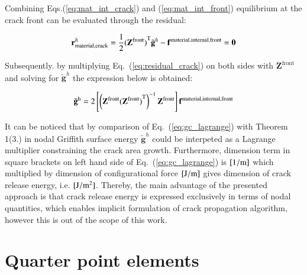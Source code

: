 \documentclass[11pt]{acmeArticle}
\numberwithin{equation}{section}
\begin{document}
Combining Eqs.(\ref{eq:mat_int_crack}) and (\ref{eq:mat_int_front}) equilibrium at the crack front can be evaluated through the residual:

\begin{equation}
\mathbf{r}^h_{\textrm{material,crack}} = \dfrac{1}{2} {(\mathbf{Z}^\textrm{front})}^{\rm{T}} {\tilde{\mathbf{g}}}^h - \mathbf{f}^\textrm{material,internal,front} = \mathbf{0}
	\label{eq:residual_crack}
\end{equation}

Subsequently. by multiplying Eq.~(\ref{eq:residual_crack}) on both sides with $\mathbf{Z}^\textrm{front}$ and solving for ${\tilde{\mathbf{g}}}^h$ the expression below is obtained:


\begin{equation}
	{\tilde{\mathbf{g}}}^\textrm{h}
	= 2
	\left[
	\left(\mathbf{Z}^{\rm{front}}{(\mathbf{Z}^{\rm{front}})}^\textrm{T}\right)^{-1}
	\mathbf{Z}^{\rm{front}}
	\right]
	\mathbf{f}^\textrm{material,internal,front}	
\label{eq:gc_lagrange}
\end{equation}

It can be noticed that by comparison of Eq.~({\ref{eq:gc_lagrange}}) with Theorem 1(3.) in \citep{AinsworthEssential} 
nodal Griffith surface energy ${\tilde{\mathbf{g}}}^h$ could be interpeted as a Lagrange multiplier constraining the crack area growth.
Furthermore, dimension term in square brackets on left hand side of Eq.~(\ref{eq:gc_lagrange}) is $[\rm{1/m}]$ which multiplied by dimension
of configurational force $[\rm{J/m}]$ gives dimension of crack release energy, i.e.
$[{\rm{J/m^2}}]$. Thereby, the main advantage of the presented approach is that crack release 
energy is expressed exclusively in terms of nodal quantities, which enables
implicit formulation of crack propagation algorithm, however this is 
out of the scope of this work.

\section{Quarter point elements}
\end{document}
